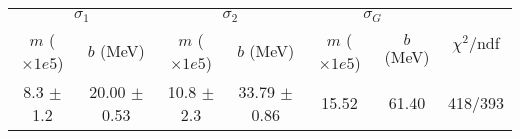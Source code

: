 \begin{tabular}{cc|cc|cc||c}
\multicolumn{2}{c|}{$\sigma_1$} & \multicolumn{2}{|c}{$\sigma_2$} & \multicolumn{2}{|c}{$\sigma_G$}  & \multirow{2}{*}{$\chi^2/$ndf}\\
$m$ ($\times1e5$) & $b$ (MeV) & $m$ ($\times1e5$) & $b$ (MeV) & $m$ ($\times1e5$) & $b$ (MeV) & \\
\hline
8.3 $\pm$ 1.2 & 20.00 $\pm$ 0.53 & 10.8 $\pm$ 2.3 & 33.79 $\pm$ 0.86 & 15.52 & 61.40 & 418/393\\
\end{tabular}
